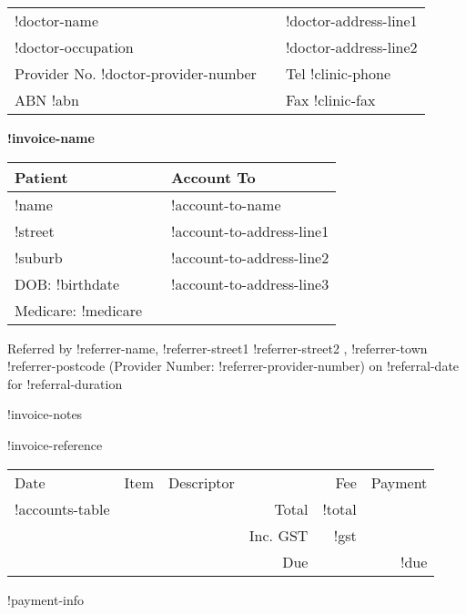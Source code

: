 \documentclass[12pt]{article}
\begin{document}
\begin{center}
\begin{tabular}{p{}>{\centering}p{}<{\centering}p{}<{\raggedleft}}
!doctor-name &  & !doctor-address-line1 \\
!doctor-occupation &  & !doctor-address-line2 \\
Provider No. !doctor-provider-number & & Tel !clinic-phone \\
ABN !abn & & Fax !clinic-fax \\ 
\hline
\end{tabular}

\vspace{7mm}

{ \Large \textbf{!invoice-name} }

\end{center}

\vspace{4mm}


\begin{tabular}{lp{5mm}l} 
Patient & & Account To\\ \midrule
!name & & !account-to-name \\
!street & & !account-to-address-line1 \\
!suburb & & !account-to-address-line2 \\
DOB: !birthdate &  & !account-to-address-line3 \\
Medicare:   !medicare & &   \\
\end{tabular}

\vspace{3mm}

Referred by !referrer-name, !referrer-street1 !referrer-street2 ,
!referrer-town !referrer-postcode (Provider Number: !referrer-provider-number)
on !referral-date for !referral-duration

\vspace{3mm}

!invoice-notes

!invoice-reference

\vspace{3mm}

\begin{tabularx}{\textwidth}{llp{50mm}rrr}
Date & Item & Descriptor & & Fee & Payment \\ \cmidrule(l){1-6}
!accounts-table
\cmidrule(l){5-6}
& & & Total & !total  & \\
& & & Inc. GST & !gst & \\ \cmidrule(l){5-6}
& & & Due & & !due \\

\end{tabularx}

!payment-info
\end{document}
